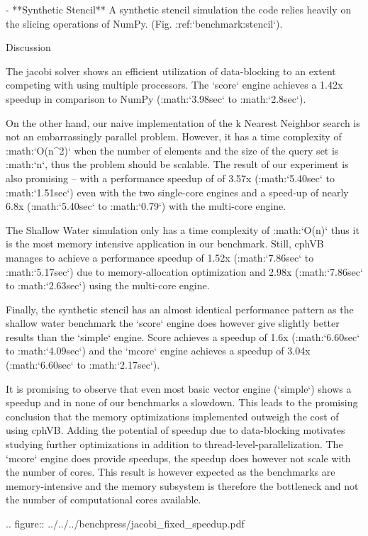  - **Synthetic Stencil** A synthetic stencil simulation the code relies heavily on the slicing operations of NumPy. (Fig. :ref:`benchmark:stencil`).


Discussion
~~~~~~~~~~

The jacobi solver shows an efficient utilization of data-blocking to an extent competing with using multiple processors. The `score` engine achieves a 1.42x speedup in comparison to NumPy (:math:`3.98sec` to :math:`2.8sec`).

On the other hand, our naive implementation of the k Nearest Neighbor search is not an embarrassingly parallel problem. However, it has a time complexity of :math:`O(n^2)` when the number of elements and the size of the query set is :math:`n`, thus the problem should be scalable. The result of our experiment is also promising – with a performance speedup of of 3.57x (:math:`5.40sec` to :math:`1.51sec`) even with the two single-core engines and a speed-up of nearly 6.8x (:math:`5.40sec` to :math:`0.79`)  with the multi-core engine.

The Shallow Water simulation only has a time complexity of :math:`O(n)` thus it is the most memory intensive application in our benchmark. Still, cphVB manages to achieve a performance speedup of 1.52x (:math:`7.86sec` to :math:`5.17sec`) due to memory-allocation optimization and 2.98x (:math:`7.86sec` to :math:`2.63sec`) using the multi-core engine. 

Finally, the synthetic stencil has an almost identical performance pattern as the shallow water benchmark the `score` engine does however give slightly better results than the `simple` engine. Score achieves a speedup of 1.6x (:math:`6.60sec` to :math:`4.09sec`) and the `mcore` engine achieves a speedup of 3.04x (:math:`6.60sec` to :math:`2.17sec`).

It is promising to observe that even most basic vector engine (`simple`) shows a speedup and in none of our benchmarks a slowdown. This leads to the promising conclusion that the memory optimizations implemented outweigh the cost of using cphVB. Adding the potential of speedup due to data-blocking motivates studying further optimizations in addition to thread-level-parallelization.
The `mcore` engine does provide speedups, the speedup does however not scale with the number of cores. This result is however expected as the benchmarks are memory-intensive and the memory subsystem is therefore the bottleneck and not the number of computational cores available.

.. figure:: ../../../benchpress/jacobi_fixed_speedup.pdf

